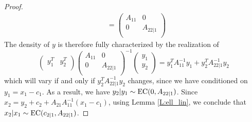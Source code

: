 \begin{proof}
\begin{align*}
  &=
    \begin{pmatrix}
      A_{11} & 0       \\
      0      & A_{22|1}\\
    \end{pmatrix}
\end{align*}
The density of $y$ is therefore fully characterized by the realization of
\[
  \begin{pmatrix}
    y_1^T & y_2^T \\
  \end{pmatrix}
  \begin{pmatrix}
    A_{11} & 0       \\
    0      & A_{22|1}\\
  \end{pmatrix}^{-1}
  \begin{pmatrix}
    y_1 \\
	y_2 \\
  \end{pmatrix}
  = y_1^T A_{11}^{-1} y_1 + y_2^T A_{22|1}^{-1} y_2
\]
which will vary if and only if $y_2^T A_{22|1}^{-1} y_2$ changes, since we have
conditioned on $y_1=x_1-c_1$. As a result, we have 
$y_2|y_1\sim \operatorname*{EC}(0,A_{22|1})$. Since $x_2=y_2+c_2+A_{21}A_{11}^{-1}(x_1-c_1)$,
using Lemma \ref{L:ell_lin}, we conclude that
$x_2|x_1\sim \operatorname*{EC}(c_{2|1},A_{22|1})$.
\end{proof}

